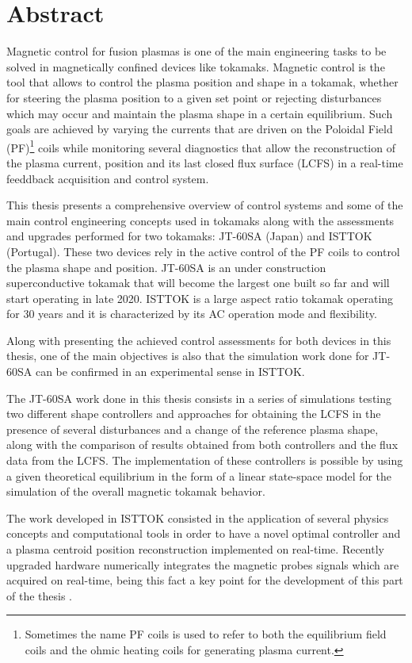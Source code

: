 \chapter*{Abstract}
Magnetic control for fusion plasmas is one of the main engineering tasks to be solved in magnetically  confined devices like tokamaks. Magnetic control is the tool that allows to control the plasma position and shape in a tokamak, whether  for steering the plasma position to a given set point or rejecting disturbances which may occur and maintain the plasma shape in a certain equilibrium. Such goals are achieved by varying the currents that are driven on the Poloidal Field (PF)\footnote{Sometimes the name PF coils is used to refer to  both the equilibrium field coils and the ohmic heating coils for generating plasma current.} coils while monitoring several diagnostics that allow the reconstruction of the plasma current, position and its last closed flux surface (LCFS) in a real-time feeddback acquisition and control system.
\smallskip

This thesis presents a comprehensive overview of control systems and some of the main control engineering concepts used in tokamaks along with  the assessments and upgrades performed for two tokamaks: JT-60SA (Japan) and ISTTOK (Portugal). These two devices rely in the active control of the PF coils to control the plasma shape and position. JT-60SA is an under construction superconductive tokamak that will become the largest one built so far and will start operating in late 2020. ISTTOK is a large aspect ratio tokamak operating for 30 years and it is characterized by its AC operation mode and flexibility. \smallskip

 Along with presenting the achieved control assessments for both devices in this thesis, one of the main objectives  is also that the simulation work done for JT-60SA can be confirmed in an experimental sense in ISTTOK. \smallskip

 
The JT-60SA work done in this thesis consists in a series of simulations testing two different shape controllers and  approaches for obtaining the LCFS  in the presence of several disturbances and a change of the reference plasma shape, along with the comparison of results obtained from both controllers and the flux data from the LCFS. The implementation of these controllers is possible by using a given theoretical equilibrium in the form of a linear state-space model for the simulation of the overall magnetic  tokamak behavior. \smallskip

 The work developed in ISTTOK consisted in the application of several physics concepts and computational tools in order to have a novel optimal controller and a plasma centroid position reconstruction implemented on real-time. Recently upgraded hardware numerically integrates  the magnetic probes signals which are acquired on real-time, being this fact a key point for the development of this part of the thesis .\smallskip
 

